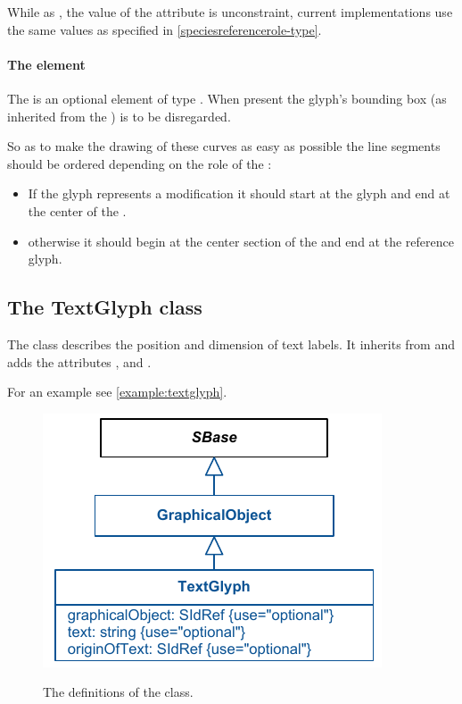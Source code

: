While as , the value of the  attribute is unconstraint, 
current implementations use the same values as specified in \ref{speciesreferencerole-type}.

\paragraph{The  element}
The  is an optional element of type \Curve. When present 
the glyph's bounding box (as inherited from the \GraphicalObject) is to 
be disregarded. 

So as to make the drawing of these curves as easy as possible the line 
segments should be ordered depending on the role of the \ReferenceGlyph:

\begin{itemize}
	\item If the glyph represents a modification it should start at the glyph and end at the center of the \GeneralGlyph.
	\item otherwise it should begin at the center section of the \GeneralGlyph and end at the reference glyph. 
\end{itemize}


\subsection{The TextGlyph class}
\label{textglyph-class}
The \TextGlyph class describes the position and dimension of text 
labels. It inherits from \GraphicalObject and adds the attributes 
,  and . 


For an example see \ref{example:textglyph}.

\begin{figure}[!h]
\includegraphics{uml/layout-textglyph-uml}\\
\caption{The definitions of the \TextGlyph class.}
\label{uml:textglyph}
\end{figure}

